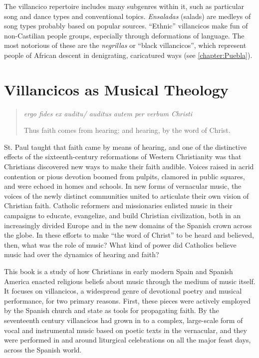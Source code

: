 \documentclass[oneside,12pt]{book}
\begin{document}
    The villancico repertoire includes many subgenres within it, such as particular song and dance types and conventional topics.
    \emph{Ensaladas} (salads) are medleys of song types probably based on popular sources.
    \enquote{Ethnic} villancicos make fun of non-Castilian people groups, especially through deformations of language.
    The most notorious of these are the \emph{negrillas} or \enquote{black villancicos}, which represent people of African descent in denigrating, caricatured ways (see \ref{chapter:Puebla}).
  
\mainmatter

\chapter{Villancicos as Musical Theology}
\label{chapter:intro}

\begin{quote}
\emph{ergo fides ex auditu/ auditus autem per verbum Christi}

Thus faith comes from hearing; and hearing, by the word of Christ.
\end{quote}

    St. Paul taught that faith came by means of hearing, and one of the distinctive effects of the sixteenth-century reformations of Western Christianity was that Christians discovered new ways to make their faith audible.
    Voices raised in acrid contention or pious devotion boomed from pulpits, clamored in public squares, and were echoed in homes and schools.
    In new forms of vernacular music, the voices of the newly distinct communities united to articulate their own vision of Christian faith.
    Catholic reformers and missionaries enlisted music in their campaigns to educate, evangelize, and build Christian civilization, both in an increasingly divided Europe and in the new domains of the Spanish crown across the globe. 
    In these efforts to make \enquote{the word of Christ} to be heard and believed, then, what was the role of music?
    What kind of power did Catholics believe music had over the dynamics of hearing and faith?
  
    This book is a study of how Christians in early modern Spain and Spanish America enacted religious beliefs about music through the medium of music itself.
    It focuses on villancicos, a widespread genre of devotional poetry and musical performance, for two primary reasons.
    First, these pieces were actively employed by the Spanish church and state as tools for propagating faith.
    By the seventeenth century villancicos had grown in to a complex, large-scale form of vocal and instrumental music based on poetic texts in the vernacular, and they were performed in and around liturgical celebrations on all the major feast days, across the Spanish world.
  
\end{document}
